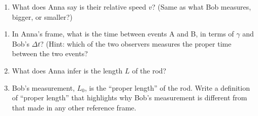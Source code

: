 \begin{enumerate}
\item What does Anna say is their relative speed $v$?  (Same as what Bob measures, bigger, or smaller?)
\answerspace{0.4in}
\end{enumerate}

\begin{enumerate}
\item In Anna's frame, what is the time between events A and B, in terms of $\gamma$ and Bob's $\Delta t$?  (Hint: which of the two observers measures the proper time between the two events?  
\answerspace{0.4in}

\item What does Anna infer is the length $L$ of the rod?  
\answerspace{0.4in}

\item Bob's measurement, $L_0$, is the ``proper length'' of the rod.  Write a definition of ``proper length'' that highlights why Bob's measurement is different from that made in any other reference frame.
\answerspace{0.5in}
\end{enumerate}
